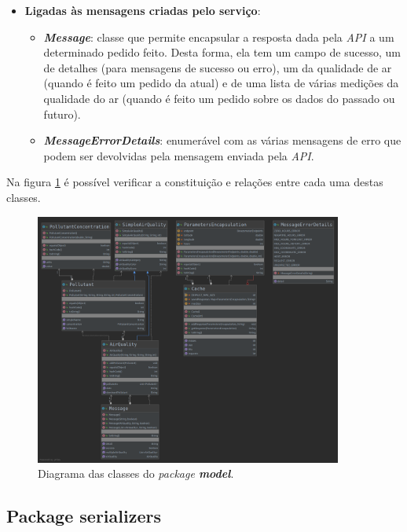 \begin{itemize}
\begin{itemize}
      \end{itemize}
   \item \textbf{Ligadas às mensagens criadas pelo serviço}:
      \begin{itemize}
         \item \textbf{\textit{Message}}: classe que permite encapsular a resposta dada pela \textit{API} a um determinado pedido feito. Desta forma, ela tem um campo de sucesso, um de detalhes (para mensagens de sucesso ou erro), um da qualidade de ar (quando é feito um pedido da atual) e de uma lista de várias medições da qualidade do ar (quando é feito um pedido sobre os dados do passado ou futuro).
         \item \textbf{\textit{MessageErrorDetails}}: enumerável com as várias mensagens de erro que podem ser devolvidas pela mensagem enviada pela \textit{API}.
      \end{itemize}
\end{itemize}

Na figura \ref{fig:model_diagram} é possível verificar a constituição e relações entre cada uma destas classes.

\begin{figure}[h]
   \centering
   \includegraphics[width=0.90\textwidth]{images/model_diagram}
   \caption{Diagrama das classes do \textit{package \textbf{model}}.}
   \label{fig:model_diagram}
\end{figure}


\subsection{Package serializers}

